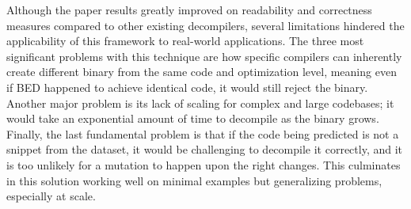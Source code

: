 \documentclass[conference,a4paper]{IEEEtran}
\begin{document}
Although the paper results greatly improved on readability and correctness measures compared to other existing decompilers, several limitations hindered the applicability of this framework to real-world applications.
The three most significant problems with this technique are how specific compilers can inherently create different binary from the same code and optimization level, meaning even if BED happened to achieve identical code, it would still reject the binary.
Another major problem is its lack of scaling for complex and large codebases; it would take an exponential amount of time to decompile as the binary grows.
Finally, the last fundamental problem is that if the code being predicted is not a snippet from the dataset, it would be challenging to decompile it correctly, and it is too unlikely for a mutation to happen upon the right changes.
This culminates in this solution working well on minimal examples but generalizing problems, especially at scale.

\printbibliography
\end{document}
